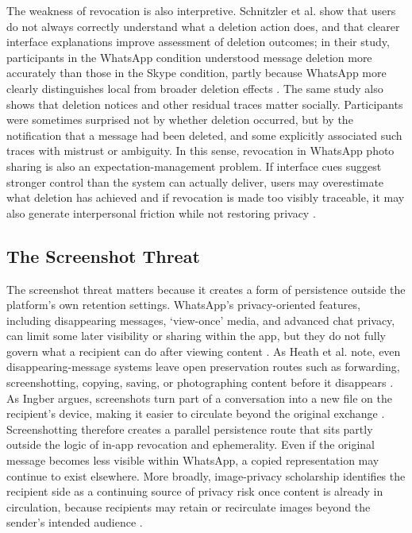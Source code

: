 The weakness of revocation is also interpretive. Schnitzler et al. show that users do not always correctly understand what a deletion action does, and that clearer interface explanations improve assessment of deletion outcomes; in their study, participants in the WhatsApp condition understood message deletion more accurately than those in the Skype condition, partly because WhatsApp more clearly distinguishes local from broader deletion effects \cite{schnitzler_2020}. The same study also shows that deletion notices and other residual traces matter socially. Participants were sometimes surprised not by whether deletion occurred, but by the notification that a message had been deleted, and some explicitly associated such traces with mistrust or ambiguity. In this sense, revocation in WhatsApp photo sharing is also an expectation-management problem. If interface cues suggest stronger control than the system can actually deliver, users may overestimate what deletion has achieved and if revocation is made too visibly traceable, it may also generate interpersonal friction while not restoring privacy \cite{schnitzler_2020}.


\subsection{The Screenshot Threat}

The screenshot threat matters because it creates a form of persistence outside the platform's own retention settings. WhatsApp's privacy-oriented features, including disappearing messages, `view-once' media, and advanced chat privacy, can limit some later visibility or sharing within the app, but they do not fully govern what a recipient can do after viewing content \cite{whatsapp_disappearing_messages, whatsapp_view_once, whatsapp_advanced_chat_privacy}. As Heath et al. note, even disappearing-message systems leave open preservation routes such as forwarding, screenshotting, copying, saving, or photographing content before it disappears \cite{heath_2023}. As Ingber argues, screenshots turn part of a conversation into a new file on the recipient's device, making it easier to circulate beyond the original exchange \cite{ingber_2025}. Screenshotting therefore creates a parallel persistence route that sits partly outside the logic of in-app revocation and ephemerality. Even if the original message becomes less visible within WhatsApp, a copied representation may continue to exist elsewhere. More broadly, image-privacy scholarship identifies the recipient side as a continuing source of privacy risk once content is already in circulation, because recipients may retain or recirculate images beyond the sender's intended audience \cite{liu_privacy_2023}.


